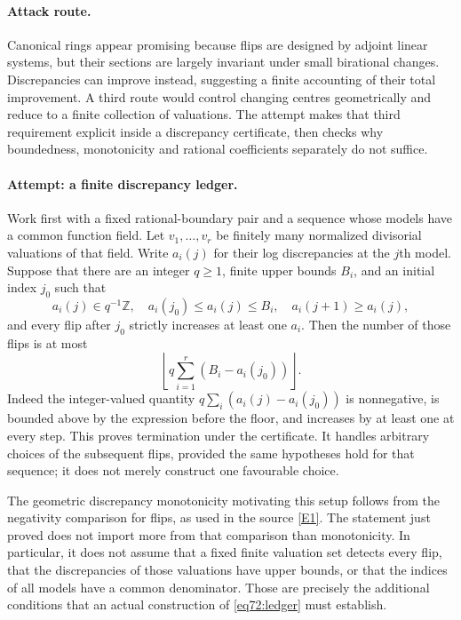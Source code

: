 \documentclass[11pt,a4paper]{article}
\numberwithin{equation}{section}
\newcommand{\Z}{\mathbb{Z}}
\newcommand{\eref}[2]{\hyperlink{extra:#1:#2}{[E#2]}}
\begin{document}
\paragraph{Attack route.}
Canonical rings appear promising because flips are designed by adjoint
linear systems, but their sections are largely invariant under small
birational changes. Discrepancies can improve instead, suggesting a finite
accounting of their total improvement. A third route would control changing
centres geometrically and reduce to a finite collection of valuations.
The attempt makes that third requirement explicit inside a discrepancy
certificate, then checks why boundedness, monotonicity and rational
coefficients separately do not suffice.

\paragraph{Attempt: a finite discrepancy ledger.}
Work first with a fixed rational-boundary pair and a sequence whose models
have a common function field. Let $v_1,\ldots,v_r$ be finitely many
normalized divisorial valuations of that field. Write $a_i(j)$ for their
log discrepancies at the $j$th model. Suppose that there are an integer
$q\geq1$, finite upper bounds $B_i$, and an initial index $j_0$ such that
\begin{equation}\label{eq72:ledger}
 a_i(j)\in q^{-1}\Z,\quad
 a_i(j_0)\leq a_i(j)\leq B_i,\quad
 a_i(j+1)\geq a_i(j),
\end{equation}
and every flip after $j_0$ strictly increases at least one $a_i$.
Then the number of those flips is at most
\begin{equation}\label{eq72:bound}
 \left\lfloor q\sum_{i=1}^r(B_i-a_i(j_0))\right\rfloor.
\end{equation}
Indeed the integer-valued quantity
$q\sum_i(a_i(j)-a_i(j_0))$ is nonnegative, is bounded above by the
expression before the floor, and increases by at least one at every step.
This proves termination under the certificate. It handles arbitrary choices
of the subsequent flips, provided the same hypotheses hold for that
sequence; it does not merely construct one favourable choice.

The geometric discrepancy monotonicity motivating this setup follows from
the negativity comparison for flips, as used in the source
\eref{30006709}{1}. The statement just proved does not import more from that
comparison than monotonicity. In particular, it does not assume that a
fixed finite valuation set detects every flip, that the discrepancies of
those valuations have upper bounds, or that the indices of all models
have a common denominator. Those are precisely the additional conditions
that an actual construction of \eqref{eq72:ledger} must establish.
\end{document}
